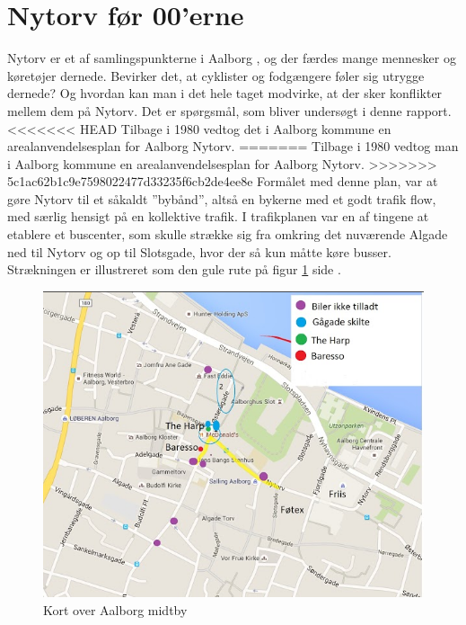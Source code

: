 \section{Nytorv før 00'erne}
\label{sec:nytorv_foer_null}
Nytorv er et af samlingspunkterne i Aalborg , og der færdes mange mennesker og køretøjer dernede. Bevirker det, at cyklister og fodgængere føler sig utrygge dernede? Og hvordan kan man i det hele taget modvirke, at der sker konflikter mellem dem på Nytorv. Det er spørgsmål, som bliver undersøgt i denne rapport.
<<<<<<< HEAD
Tilbage i 1980 vedtog det i Aalborg kommune en arealanvendelsesplan for Aalborg Nytorv. \autocite{Madsen2010}
=======
Tilbage i 1980 vedtog man i Aalborg kommune en arealanvendelsesplan for Aalborg Nytorv. \autocite{arealplan}
>>>>>>> 5c1ac62b1c9e7598022477d33235f6cb2de4ee8e
Formålet med denne plan, var at gøre Nytorv til et såkaldt ”bybånd”, altså en bykerne med et godt trafik flow, med særlig hensigt på en kollektive trafik. I trafikplanen var en af tingene at etablere et buscenter, som skulle strække sig fra omkring det nuværende Algade ned til Nytorv og op til Slotsgade, hvor der så kun måtte køre busser. Strækningen er illustreret som den gule rute på figur \cref{fig:midtby} side \pageref{fig:midtby}.
\begin{figure}[htbp]
   \centering
   \begin{adjustbox}{max width=\textwidth}
     \includegraphics[scale=0.3]{figures/Billederogfigur/midtby.jpg}
  \end{adjustbox}
   \caption{Kort over Aalborg midtby \autocite{gm2015}}
   \label{fig:midtby}
 \end{figure}
